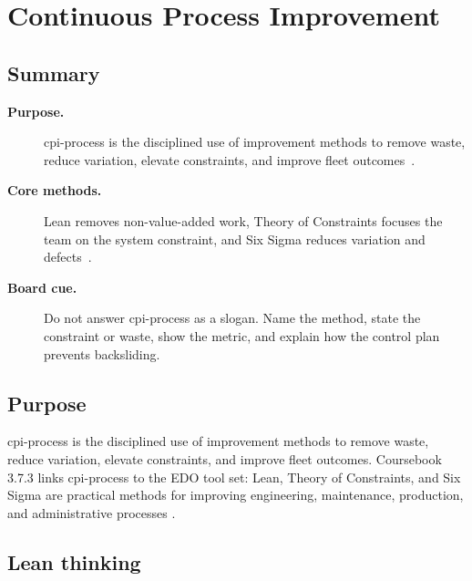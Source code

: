 \documentclass[../main.tex]{subfiles}
\begin{document}

\section{Continuous Process Improvement}

\subsection{Summary}
\begin{description}
  \item[\textbf{Purpose.}] \ac{cpi-process} is the disciplined use of improvement methods to remove waste,
  reduce variation, elevate constraints, and improve fleet outcomes~\autocite{edo-3-7-3-intro-cpi-2025}.
  \item[\textbf{Core methods.}] Lean removes non-value-added work, Theory of Constraints focuses the team on
  the system constraint, and Six Sigma reduces variation and defects~\autocite{edo-3-7-3-intro-cpi-2025}.
  \item[\textbf{Board cue.}] Do not answer \ac{cpi-process} as a slogan. Name the method, state the constraint
  or waste, show the metric, and explain how the control plan prevents backsliding.
\end{description}

\subsection{Purpose}

\ac{cpi-process} is the disciplined use of improvement
methods to remove waste, reduce variation, elevate constraints, and improve
fleet outcomes.  Coursebook 3.7.3 links \ac{cpi-process} to the EDO tool set: Lean, Theory
of Constraints, and Six Sigma are practical methods for improving engineering,
maintenance, production, and administrative processes
\autocite{edo-3-7-3-intro-cpi-2025}.

\subsection{Lean thinking}
\end{document}
